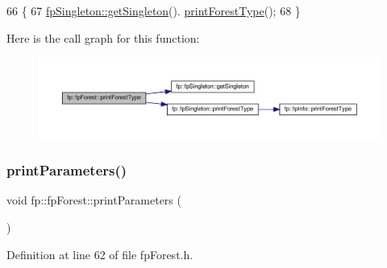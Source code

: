 \begin{DoxyCode}
66                                          \{
67                 \hyperlink{classfp_1_1fpSingleton_a8bdae77b68521003e3fc630edec2e240}{fpSingleton::getSingleton}().
      \hyperlink{classfp_1_1fpSingleton_ad9696336521f72c7c6a021608799871e}{printForestType}();
68             \}
\end{DoxyCode}
Here is the call graph for this function\+:
\nopagebreak
\begin{figure}[H]
\begin{center}
\leavevmode
\includegraphics[width=350pt]{classfp_1_1fpForest_a4a7ffa92224570d6a97eff8bd5e9b0fa_cgraph}
\end{center}
\end{figure}
\mbox{\label{classfp_1_1fpForest_ae096def0ca26f0771b27341d7b218066}} 
\subsubsection{\texorpdfstring{print\+Parameters()}{printParameters()}}
{\footnotesize\ttfamily void fp\+::fp\+Forest\+::print\+Parameters (\begin{DoxyParamCaption}{ }\end{DoxyParamCaption})\hspace{0.3cm}{\ttfamily [inline]}}



Definition at line 62 of file fp\+Forest.\+h.


